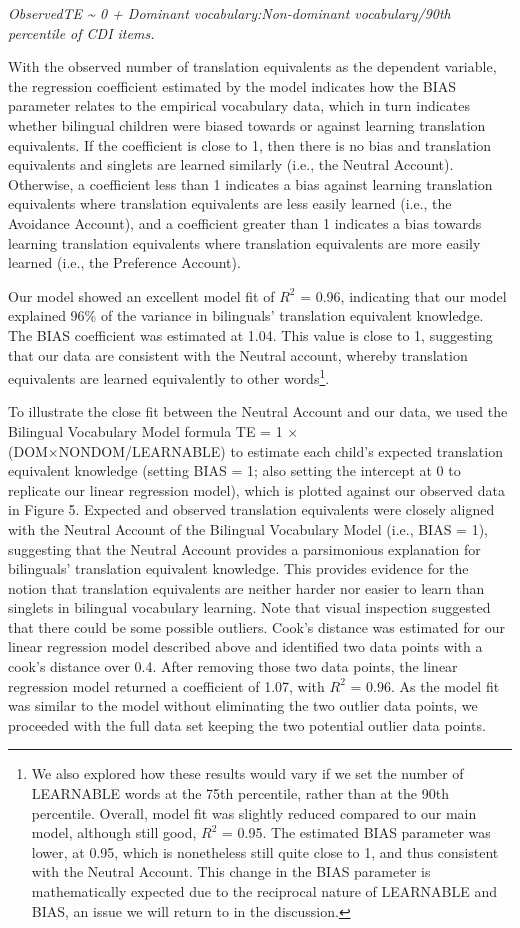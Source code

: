 \documentclass[
  english,
  ,man,floatsintext]{apa6}
\begin{document}
\emph{ObservedTE \textasciitilde{} 0 + Dominant vocabulary:Non-dominant vocabulary/90th percentile of CDI items.}

With the observed number of translation equivalents as the dependent variable, the regression coefficient estimated by the model indicates how the BIAS parameter relates to the empirical vocabulary data, which in turn indicates whether bilingual children were biased towards or against learning translation equivalents. If the coefficient is close to 1, then there is no bias and translation equivalents and singlets are learned similarly (i.e., the Neutral Account). Otherwise, a coefficient less than 1 indicates a bias against learning translation equivalents where translation equivalents are less easily learned (i.e., the Avoidance Account), and a coefficient greater than 1 indicates a bias towards learning translation equivalents where translation equivalents are more easily learned (i.e., the Preference Account).

Our model showed an excellent model fit of \(R^2\) = 0.96, indicating that our model explained 96\% of the variance in bilinguals' translation equivalent knowledge. The BIAS coefficient was estimated at 1.04. This value is close to 1, suggesting that our data are consistent with the Neutral account, whereby translation equivalents are learned equivalently to other words\footnote{We also explored how these results would vary if we set the number of LEARNABLE words at the 75th percentile, rather than at the 90th percentile. Overall, model fit was slightly reduced compared to our main model, although still good, \(R^2\) = 0.95. The estimated BIAS parameter was lower, at 0.95, which is nonetheless still quite close to 1, and thus consistent with the Neutral Account. This change in the BIAS parameter is mathematically expected due to the reciprocal nature of LEARNABLE and BIAS, an issue we will return to in the discussion.}.

To illustrate the close fit between the Neutral Account and our data, we used the Bilingual Vocabulary Model formula TE = 1 × (DOM×NONDOM/LEARNABLE) to estimate each child's expected translation equivalent knowledge (setting BIAS = 1; also setting the intercept at 0 to replicate our linear regression model), which is plotted against our observed data in Figure 5. Expected and observed translation equivalents were closely aligned with the Neutral Account of the Bilingual Vocabulary Model (i.e., BIAS = 1), suggesting that the Neutral Account provides a parsimonious explanation for bilinguals' translation equivalent knowledge. This provides evidence for the notion that translation equivalents are neither harder nor easier to learn than singlets in bilingual vocabulary learning. Note that visual inspection suggested that there could be some possible outliers. Cook's distance was estimated for our linear regression model described above and identified two data points with a cook's distance over 0.4. After removing those two data points, the linear regression model returned a coefficient of 1.07, with \(R^2\) = 0.96. As the model fit was similar to the model without eliminating the two outlier data points, we proceeded with the full data set keeping the two potential outlier data points.
\end{document}

